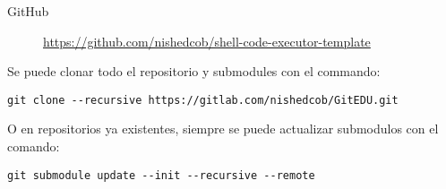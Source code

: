 \begin{description}
\begin{description}
\begin{description}
\begin{description}
                \item[GitHub] \sloppy \url{https://github.com/nishedcob/shell-code-executor-template}
            \end{description}
        \end{description}
    \end{description}
    Se puede clonar todo el repositorio y submodules con el commando:
    \begin{lstlisting}[breaklines]
git clone --recursive https://gitlab.com/nishedcob/GitEDU.git
    \end{lstlisting}
    O en repositorios ya existentes, siempre se puede actualizar submodulos con el comando:
    \begin{lstlisting}
git submodule update --init --recursive --remote
    \end{lstlisting}
\end{description}
